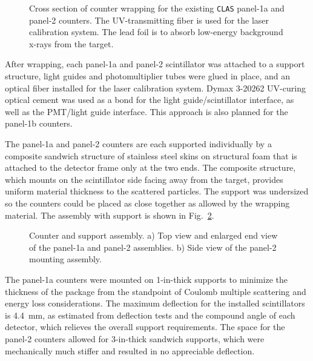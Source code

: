 \begin{figure}[ht]
\vspace{6.5cm}
\caption{\small{Cross section of counter wrapping for the existing {\tt CLAS} 
panel-1a and panel-2 counters. The UV-transmitting fiber is used for the
laser calibration system.  The lead foil is to absorb low-energy background 
x-rays from the target.}}
\label{wrap}
\end{figure}

After wrapping, each panel-1a and panel-2 scintillator was attached to a 
support structure, light guides and photomultiplier tubes were glued in 
place, and an optical fiber installed for the laser calibration system. 
Dymax 3-20262 UV-curing optical cement was used as a bond for the light
guide/scintillator interface, as well as the PMT/light guide interface.
This approach is also planned for the panel-1b counters.

The panel-1a and panel-2 counters are each supported individually by a
composite sandwich structure of stainless steel skins on structural foam 
that is attached to the detector frame only at the two ends. The composite 
structure, which mounts on the scintillator side facing away from the target,
provides uniform material thickness to the scattered particles.  The support 
was undersized so the counters could be placed as close together as allowed 
by the wrapping material.  The assembly with support is shown in 
Fig.~\ref{support}.

\begin{figure}[ht]
\vspace{10.5cm}
\caption{\small{Counter and support assembly. a) Top view and enlarged end 
view of the panel-1a and panel-2 assemblies.  b) Side view of the panel-2
mounting assembly.}}
\label{support}
\end{figure}

The panel-1a counters were mounted on 1-in-thick supports to minimize the 
thickness of the package from the standpoint of Coulomb multiple scattering
and energy loss considerations.  The maximum deflection for the installed 
scintillators is 4.4~mm, as estimated from deflection tests and the compound 
angle of each detector,  which relieves the overall support requirements.
The space for the panel-2 counters allowed for 3-in-thick sandwich supports,
which were mechanically much stiffer and resulted in no appreciable 
deflection. 

